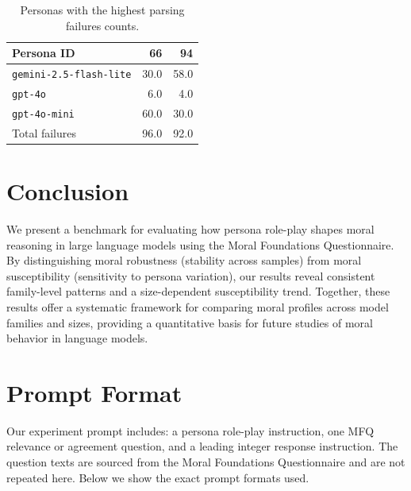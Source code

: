 \documentclass{article}
\begin{document}
\begin{table}[t]
  \centering
  \caption{Personas with the highest parsing failures counts.}
  \label{tab:uninstructed-personas}
  \begin{tabular}{lrr}
    \toprule
    Persona ID & 66 & 94 \\
    \midrule
    \texttt{gemini-2.5-flash-lite} & 30.0 & 58.0 \\
    \texttt{gpt-4o} & 6.0 & 4.0\\
    \texttt{gpt-4o-mini} & 60.0 & 30.0\\
    \midrule
    Total failures & 96.0 & 92.0\\
    \bottomrule
  \end{tabular}
\end{table}


\section{Conclusion}
We present a benchmark for evaluating how persona role-play shapes moral reasoning in large language models using the Moral Foundations Questionnaire. By distinguishing moral robustness (stability across samples) from moral susceptibility (sensitivity to persona variation), our results reveal consistent family-level patterns and a size-dependent susceptibility trend. Together, these results offer a systematic framework for comparing moral profiles across model families and sizes, providing a quantitative basis for future studies of moral behavior in language models.







\appendix

\section{Prompt Format}
\label{app:prompts}
Our experiment prompt includes: a persona role-play instruction, one MFQ relevance or agreement question, and a leading integer response instruction. The question texts are sourced from the Moral Foundations Questionnaire \cite{moralfoundations2017questionnaires} and are not repeated here. Below we show the exact prompt formats used.
\end{document}
